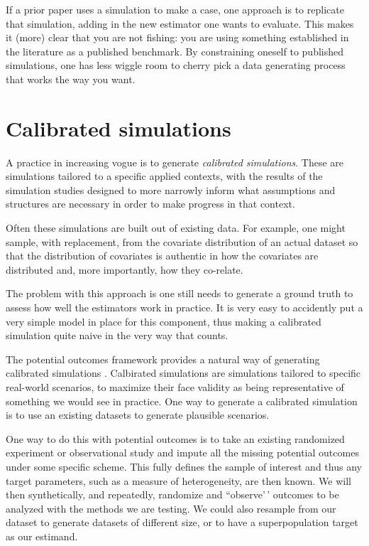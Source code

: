 \documentclass[
]{book}
\begin{document}
If a prior paper uses a simulation to make a case, one approach is to replicate that simulation, adding in the new estimator one wants to evaluate.
This makes it (more) clear that you are not fishing: you are using something established in the literature as a published benchmark.
By constraining oneself to published simulations, one has less wiggle room to cherry pick a data generating process that works the way you want.

\hypertarget{calibrated-simulations}{%
\section{Calibrated simulations}\label{calibrated-simulations}}

A practice in increasing vogue is to generate \emph{calibrated simulations}.
These are simulations tailored to a specific applied contexts, with the results of the simulation studies designed to more narrowly inform what assumptions and structures are necessary in order to make progress in that context.

Often these simulations are built out of existing data.
For example, one might sample, with replacement, from the covariate distribution of an actual dataset so that the distribution of covariates is authentic in how the covariates are distributed and, more importantly, how they co-relate.

The problem with this approach is one still needs to generate a ground truth to assess how well the estimators work in practice.
It is very easy to accidently put a very simple model in place for this component, thus making a calibrated simulation quite naive in the very way that counts.

The potential outcomes framework provides a natural way of generating calibrated simulations \citep{Kern_calibrated}.
Calbirated simulations are simulations tailored to specific real-world scenarios, to maximize their face validity as being representative of something we would see in practice.
One way to generate a calibrated simulation is to use an existing datasets to generate plausible scenarios.

One way to do this with potential outcomes is to take an existing randomized experiment or observational study and impute all the missing potential outcomes under some specific scheme.
This fully defines the sample of interest and thus any target parameters, such as a measure of heterogeneity, are then known.
We will then synthetically, and repeatedly, randomize and ``observe'\,' outcomes to be analyzed with the methods we are testing.
We could also resample from our dataset to generate datasets of different size, or to have a superpopulation target as our estimand.
\end{document}
